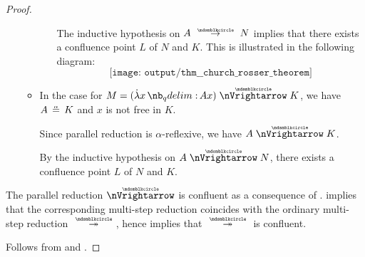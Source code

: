 \begin{proof}
\begin{itemize}
\begin{itemize}
\begin{itemize}
        The inductive hypothesis on \( A \pred N \) implies that there exists a confluence point \( L \) of \( N \) and \( K \). This is illustrated in the following diagram:
        \begin{equation*}
          \texttt{[image: output/thm\_\_church\_rosser\_theorem]}
        \end{equation*}
      \end{itemize}

      \item In the case  for \( M = (\qabs x A x) \ppred K \), we have \( A \aequiv K \) and \( x \) is not free in \( K \).

      Since parallel reduction is \( \alpha \)-reflexive, we have \( A \ppred K \).

      By the inductive hypothesis on \( A \ppred N \), there exists a confluence point \( L \) of \( N \) and \( K \).
    \end{itemize}
  \end{itemize}

   The parallel reduction \( {\ppred} \) is confluent as a consequence of .  implies that the corresponding multi-step reduction coincides with the ordinary multi-step reduction \( {\pred*} \), hence  implies that \( {\pred*} \) is confluent.

   Follows from  and .
\end{proof}
